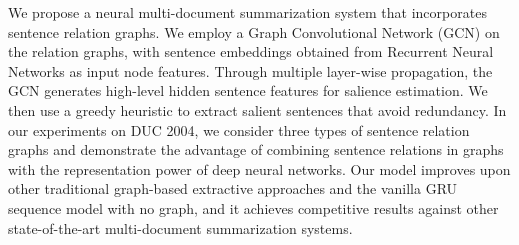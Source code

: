 We propose a neural multi-document summarization system that incorporates sentence relation graphs. We employ a Graph Convolutional Network (GCN) on the relation graphs, with sentence embeddings obtained from Recurrent Neural Networks as input node features. Through multiple layer-wise propagation, the GCN generates high-level hidden sentence features for salience estimation. We then use a greedy heuristic to extract salient sentences that avoid redundancy. In our experiments on DUC 2004, we consider three types of sentence relation graphs and demonstrate the advantage of combining sentence relations in graphs with the representation power of deep neural networks. Our model improves upon other traditional graph-based extractive approaches and the vanilla GRU sequence model with no graph, and it achieves competitive results against other state-of-the-art multi-document summarization systems.
